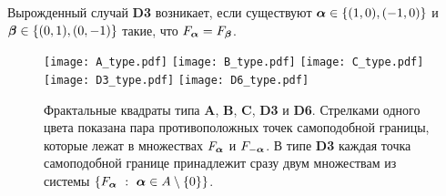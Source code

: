 \begin{remark}
Вырожденный случай {\bf D3} возникает, если существуют ${\bm{\alpha}}\in\{(1,0),(-1,0)\}$ и ${\bm{\beta}}\in\{(0,1),(0,-1)\}$ такие, что $F_{\bm{\alpha}}=F_{\bm{\beta}}$.
\end{remark}

\begin{figure}[H]
\centering
\texttt{[image: A\_type.pdf]}
\hfill
\texttt{[image: B\_type.pdf]}
\hfill
\texttt{[image: C\_type.pdf]}\\
\hfill
\texttt{[image: D3\_type.pdf]}
\hfill
\texttt{[image: D6\_type.pdf]}
\hfill
\caption{Фрактальные квадраты типа {\bf A}, {\bf B}, {\bf C}, {\bf D3} и {\bf D6}. Стрелками одного цвета показана пара противоположных точек самоподобной границы, которые лежат в множествах $F_{\bm{\alpha}}$ и $F_{-{\bm{\alpha}}}$. В типе {\bf D3} каждая точка самоподобной границе принадлежит сразу двум множествам из системы $\{F_{\bm{\alpha}}\ :\ {\bm{\alpha}}\in A\setminus\{0\}\}$.}
\end{figure}

